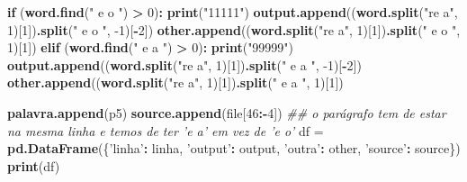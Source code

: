 \documentclass[
  12pt,
]{article}
\newenvironment{Shaded}{\begin{snugshade}}{\end{snugshade}}
\newcommand{\CommentTok}[1]{\textcolor[rgb]{0.56,0.35,0.01}{\textit{#1}}}
\newcommand{\ControlFlowTok}[1]{\textcolor[rgb]{0.13,0.29,0.53}{\textbf{#1}}}
\newcommand{\DecValTok}[1]{\textcolor[rgb]{0.00,0.00,0.81}{#1}}
\newcommand{\KeywordTok}[1]{\textcolor[rgb]{0.13,0.29,0.53}{\textbf{#1}}}
\newcommand{\NormalTok}[1]{#1}
\newcommand{\OperatorTok}[1]{\textcolor[rgb]{0.81,0.36,0.00}{\textbf{#1}}}
\newcommand{\StringTok}[1]{\textcolor[rgb]{0.31,0.60,0.02}{#1}}
\begin{document}
\begin{Shaded}
\begin{Highlighting}[]
                            \ControlFlowTok{if}\NormalTok{ (}\KeywordTok{word.find}\NormalTok{(}\StringTok{" e o "}\NormalTok{) }\OperatorTok{>}\StringTok{ }\DecValTok{0}\NormalTok{)}\OperatorTok{:}
\StringTok{                                }\KeywordTok{print}\NormalTok{(}\StringTok{"11111"}\NormalTok{)}
                                \KeywordTok{output.append}\NormalTok{((}\KeywordTok{word.split}\NormalTok{(}\StringTok{"re a"}\NormalTok{, }\DecValTok{1}\NormalTok{)[}\DecValTok{1}\NormalTok{])}\KeywordTok{.split}\NormalTok{(}\StringTok{" e o "}\NormalTok{, }\DecValTok{-1}\NormalTok{)[}\OperatorTok{-}\DecValTok{2}\NormalTok{])}
                                \KeywordTok{other.append}\NormalTok{((}\KeywordTok{word.split}\NormalTok{(}\StringTok{"re a"}\NormalTok{, }\DecValTok{1}\NormalTok{)[}\DecValTok{1}\NormalTok{])}\KeywordTok{.split}\NormalTok{(}\StringTok{" e o "}\NormalTok{, }\DecValTok{1}\NormalTok{)[}\DecValTok{1}\NormalTok{])}
                            \KeywordTok{elif}\NormalTok{ (}\KeywordTok{word.find}\NormalTok{(}\StringTok{" e a "}\NormalTok{) }\OperatorTok{>}\StringTok{ }\DecValTok{0}\NormalTok{)}\OperatorTok{:}
\StringTok{                                }\KeywordTok{print}\NormalTok{(}\StringTok{"99999"}\NormalTok{)}
                                \KeywordTok{output.append}\NormalTok{((}\KeywordTok{word.split}\NormalTok{(}\StringTok{"re a"}\NormalTok{, }\DecValTok{1}\NormalTok{)[}\DecValTok{1}\NormalTok{])}\KeywordTok{.split}\NormalTok{(}\StringTok{" e a "}\NormalTok{, }\DecValTok{-1}\NormalTok{)[}\OperatorTok{-}\DecValTok{2}\NormalTok{])}
                                \KeywordTok{other.append}\NormalTok{((}\KeywordTok{word.split}\NormalTok{(}\StringTok{"re a"}\NormalTok{, }\DecValTok{1}\NormalTok{)[}\DecValTok{1}\NormalTok{])}\KeywordTok{.split}\NormalTok{(}\StringTok{" e a "}\NormalTok{, }\DecValTok{1}\NormalTok{)[}\DecValTok{1}\NormalTok{])}

                            \KeywordTok{palavra.append}\NormalTok{(p5)}
                            \KeywordTok{source.append}\NormalTok{(file[}\DecValTok{46}\OperatorTok{:-}\DecValTok{4}\NormalTok{])}
\CommentTok{## o parágrafo tem de estar na mesma linha e temos de ter 'e a' em vez de 'e o'}
\NormalTok{df =}\StringTok{ }\KeywordTok{pd.DataFrame}\NormalTok{(\{}\StringTok{'linha'}\OperatorTok{:}\StringTok{ }\NormalTok{linha, }\StringTok{'output'}\OperatorTok{:}\StringTok{ }\NormalTok{output,}
                   \StringTok{'outra'}\OperatorTok{:}\StringTok{ }\NormalTok{other, }\StringTok{'source'}\OperatorTok{:}\StringTok{ }\NormalTok{source\})}
\KeywordTok{print}\NormalTok{(df)}


\end{Highlighting}
\end{Shaded}
\end{document}
